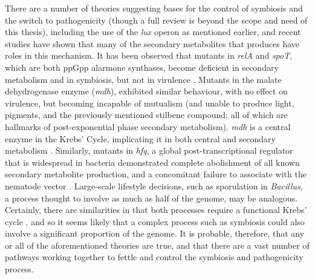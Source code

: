 There are a number of theories suggesting bases for the control of symbiosis and the switch to pathogenicity (though a full review is beyond the scope and need of this thesis), including the use of the \emph{lux} operon as mentioned earlier, and recent studies have shown that many of the secondary metabolites that \Pa{} produces have roles in this mechanism. It has been observed that mutants in \emph{relA} and \emph{spoT}, which are both ppGpp alarmone synthases, become deficient in secondary metabolism and in symbiosis, but not in virulence \citep{Bager2016}. Mutants in the malate dehydrogenase enzyme (\emph{mdh}), exhibited similar behaviour, with no effect on virulence, but becoming incapable of mutualism (and unable to produce light, pigments, and the previously mentioned stilbene compound; all of which are hallmarks of post-exponential phase secondary metabolism). \emph{mdh} is a central enzyme in the Krebs' Cycle, implicating it in both central and secondary metabolism \citep{Lango2010}. Similarly, mutants in \emph{hfq}, a global post-transcriptional regulator that is widespread in bacteria demonstrated complete abolishment of all known secondary metabolite production, and a concomitant failure to associate with the nematode vector \citep{Tobias2016}. Large-scale lifestyle decisions, such as sporulation in \emph{Bacillus}, a process thought to involve as much as half of the genome, may be analogous. Certainly, there are similarities in that both processes require a functional Krebs' cycle \citep{Stephens1998}, and so it seems likely that a complex process such as symbiosis could also involve a significant proportion of the genome. It is probable, therefore, that any or all of the aforementioned theories are true, and that there are a vast number of pathways working together to fettle and control the symbiosis and pathogenicity process.

